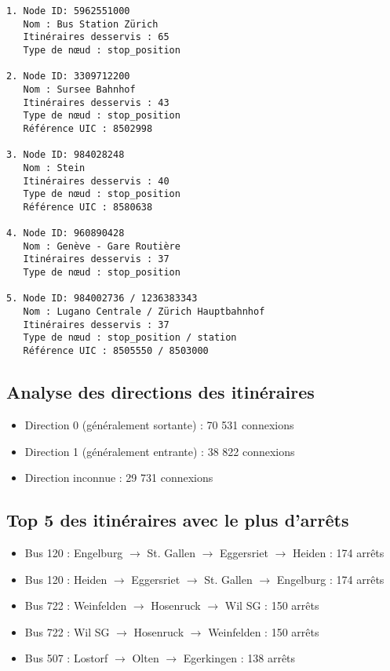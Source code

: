 \begin{tcolorbox}[colback=gray!10, colframe=brown, title=Top 5 des nœuds avec plus des itinéraires]
\begin{verbatim}
1. Node ID: 5962551000
   Nom : Bus Station Zürich
   Itinéraires desservis : 65
   Type de nœud : stop_position

2. Node ID: 3309712200
   Nom : Sursee Bahnhof
   Itinéraires desservis : 43
   Type de nœud : stop_position
   Référence UIC : 8502998

3. Node ID: 984028248
   Nom : Stein
   Itinéraires desservis : 40
   Type de nœud : stop_position
   Référence UIC : 8580638

4. Node ID: 960890428
   Nom : Genève - Gare Routière
   Itinéraires desservis : 37
   Type de nœud : stop_position

5. Node ID: 984002736 / 1236383343
   Nom : Lugano Centrale / Zürich Hauptbahnhof
   Itinéraires desservis : 37
   Type de nœud : stop_position / station
   Référence UIC : 8505550 / 8503000
\end{verbatim}
\end{tcolorbox}

\subsection{Analyse des directions des itinéraires}

\begin{itemize}
    \item Direction 0 (généralement sortante) : 70 531 connexions  
    \item Direction 1 (généralement entrante) : 38 822 connexions  
    \item Direction inconnue : 29 731 connexions  
\end{itemize}


\subsection{Top 5 des itinéraires avec le plus d'arrêts}

\begin{itemize}
    \item Bus 120 : Engelburg $\rightarrow$ St. Gallen $\rightarrow$ Eggersriet $\rightarrow$ Heiden : 174 arrêts  
    \item Bus 120 : Heiden $\rightarrow$ Eggersriet $\rightarrow$ St. Gallen $\rightarrow$ Engelburg : 174 arrêts  
    \item Bus 722 : Weinfelden $\rightarrow$ Hosenruck $\rightarrow$ Wil SG : 150 arrêts  
    \item Bus 722 : Wil SG $\rightarrow$ Hosenruck $\rightarrow$ Weinfelden : 150 arrêts  
    \item Bus 507 : Lostorf $\rightarrow$ Olten $\rightarrow$ Egerkingen : 138 arrêts  
\end{itemize}

